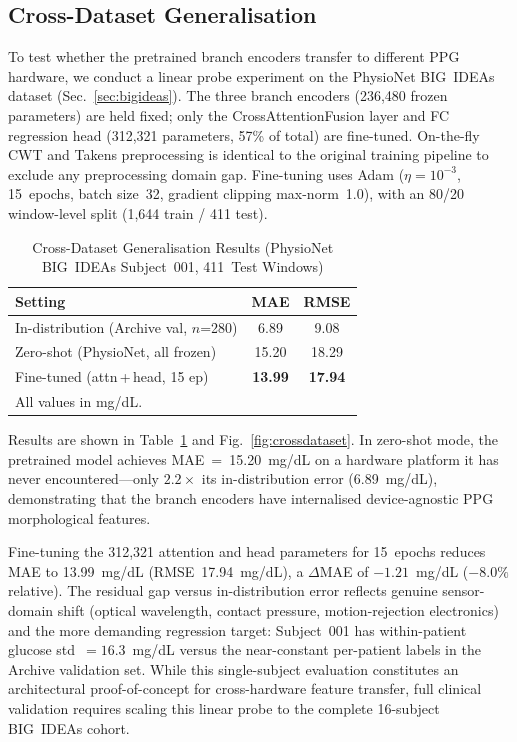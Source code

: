 \documentclass[conference]{IEEEtran}
\begin{document}
\subsection{Cross-Dataset Generalisation}
\label{sec:crossdataset}

To test whether the pretrained branch encoders transfer to different
PPG hardware, we conduct a linear probe experiment on the PhysioNet
BIG~IDEAs dataset (Sec.~\ref{sec:bigideas}).  The three branch encoders
(236,480 frozen parameters) are held fixed; only the CrossAttentionFusion
layer and FC regression head (312,321 parameters, 57\% of total) are
fine-tuned.  On-the-fly CWT and Takens preprocessing is identical to the
original training pipeline to exclude any preprocessing domain gap.
Fine-tuning uses Adam ($\eta=10^{-3}$, 15~epochs, batch size~32,
gradient clipping max-norm~1.0), with an 80/20 window-level split
(1,644 train / 411 test).

\begin{table}[htbp]
  \caption{Cross-Dataset Generalisation Results
           (PhysioNet BIG~IDEAs Subject~001, 411~Test Windows)}
  \label{tab:crossdataset}
  \centering
  \begin{tabular}{lcc}
    \toprule
    \textbf{Setting} & \textbf{MAE} & \textbf{RMSE} \\
    \midrule
    In-distribution (Archive val, $n$=280) & 6.89 & 9.08 \\
    Zero-shot (PhysioNet, all frozen)      & 15.20 & 18.29 \\
    Fine-tuned (attn\,+\,head, 15 ep)      & \textbf{13.99} & \textbf{17.94} \\
    \bottomrule
    \multicolumn{3}{l}{\footnotesize All values in mg/dL.}
  \end{tabular}
\end{table}

Results are shown in Table~\ref{tab:crossdataset} and
Fig.~\ref{fig:crossdataset}.
In zero-shot mode, the pretrained model achieves MAE~=~15.20~mg/dL on
a hardware platform it has never encountered---only $2.2\times$ its
in-distribution error (6.89~mg/dL), demonstrating that the branch
encoders have internalised device-agnostic PPG morphological features.

Fine-tuning the 312,321 attention and head parameters for 15~epochs
reduces MAE to 13.99~mg/dL (RMSE~17.94~mg/dL), a $\Delta$MAE of
$-1.21$~mg/dL ($-8.0\%$ relative).  The residual gap versus in-distribution
error reflects genuine sensor-domain shift (optical wavelength, contact
pressure, motion-rejection electronics) and the more demanding regression
target: Subject~001 has within-patient glucose std~$=16.3$~mg/dL versus
the near-constant per-patient labels in the Archive validation set.
While this single-subject evaluation constitutes an architectural
proof-of-concept for cross-hardware feature transfer, full clinical
validation requires scaling this linear probe to the complete
16-subject BIG~IDEAs cohort.
\end{document}
